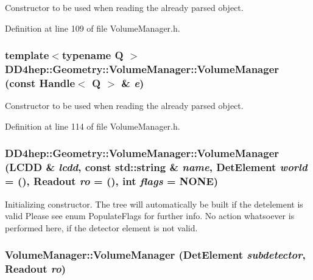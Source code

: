 Constructor to be used when reading the already parsed object. 

Definition at line 109 of file VolumeManager.h.\hypertarget{class_d_d4hep_1_1_geometry_1_1_volume_manager_a859915ea833af0e215a307c57f6b419d}{
\subsubsection[{VolumeManager}]{\setlength{\rightskip}{0pt plus 5cm}template$<$typename Q $>$ DD4hep::Geometry::VolumeManager::VolumeManager (const {\bf Handle}$<$ Q $>$ \& {\em e})}}
\label{class_d_d4hep_1_1_geometry_1_1_volume_manager_a859915ea833af0e215a307c57f6b419d}


Constructor to be used when reading the already parsed object. 

Definition at line 114 of file VolumeManager.h.\hypertarget{class_d_d4hep_1_1_geometry_1_1_volume_manager_a58b19b490cdb4d064b13c3f83e9df214}{
\subsubsection[{VolumeManager}]{\setlength{\rightskip}{0pt plus 5cm}DD4hep::Geometry::VolumeManager::VolumeManager ({\bf LCDD} \& {\em lcdd}, \/  const std::string \& {\em name}, \/  {\bf DetElement} {\em world} = {()}, \/  {\bf Readout} {\em ro} = {()}, \/  int {\em flags} = {\ttfamily NONE})}}
\label{class_d_d4hep_1_1_geometry_1_1_volume_manager_a58b19b490cdb4d064b13c3f83e9df214}
Initializing constructor. The tree will automatically be built if the detelement is valid Please see enum PopulateFlags for further info. No action whatsoever is performed here, if the detector element is not valid. \hypertarget{class_d_d4hep_1_1_geometry_1_1_volume_manager_ae1612218645bcd2734d83519d352aea9}{
\subsubsection[{VolumeManager}]{\setlength{\rightskip}{0pt plus 5cm}VolumeManager::VolumeManager ({\bf DetElement} {\em subdetector}, \/  {\bf Readout} {\em ro})}}
\label{class_d_d4hep_1_1_geometry_1_1_volume_manager_ae1612218645bcd2734d83519d352aea9}



